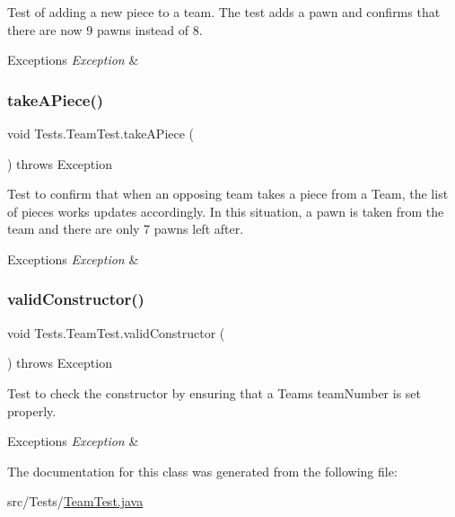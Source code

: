 Test of adding a new piece to a team. The test adds a pawn and confirms that there are now 9 pawns instead of 8. 
\begin{DoxyExceptions}{Exceptions}
{\em Exception} & \\
\hline
\end{DoxyExceptions}
\hypertarget{class_tests_1_1_team_test_a7cb853699e49ed8f2cb52056fba9be1e}{}\label{class_tests_1_1_team_test_a7cb853699e49ed8f2cb52056fba9be1e} 
\subsubsection{\texorpdfstring{take\+A\+Piece()}{takeAPiece()}}
{\footnotesize\ttfamily void Tests.\+Team\+Test.\+take\+A\+Piece (\begin{DoxyParamCaption}{ }\end{DoxyParamCaption}) throws Exception}

Test to confirm that when an opposing team takes a piece from a Team, the list of pieces works updates accordingly. In this situation, a pawn is taken from the team and there are only 7 pawns left after. 
\begin{DoxyExceptions}{Exceptions}
{\em Exception} & \\
\hline
\end{DoxyExceptions}
\hypertarget{class_tests_1_1_team_test_a2e81c6940e0a7ed7ec9f05ea4d0799d7}{}\label{class_tests_1_1_team_test_a2e81c6940e0a7ed7ec9f05ea4d0799d7} 
\subsubsection{\texorpdfstring{valid\+Constructor()}{validConstructor()}}
{\footnotesize\ttfamily void Tests.\+Team\+Test.\+valid\+Constructor (\begin{DoxyParamCaption}{ }\end{DoxyParamCaption}) throws Exception}

Test to check the constructor by ensuring that a Team\textquotesingle{}s team\+Number is set properly. 
\begin{DoxyExceptions}{Exceptions}
{\em Exception} & \\
\hline
\end{DoxyExceptions}


The documentation for this class was generated from the following file\+:\begin{DoxyCompactItemize}
\item 
src/\+Tests/\hyperlink{_team_test_8java}{Team\+Test.\+java}\end{DoxyCompactItemize}
